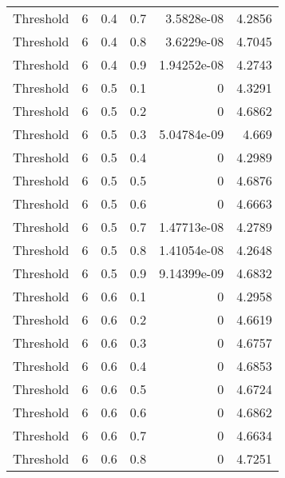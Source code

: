 \documentclass{article}
\begin{document}
\begin{longtable}[H]{lrrrrr}
 Threshold      &       6 &   0.4 &            0.7 &      3.5828e-08  &          4.2856 \\
 Threshold      &       6 &   0.4 &            0.8 &      3.6229e-08  &          4.7045 \\
 Threshold      &       6 &   0.4 &            0.9 &      1.94252e-08 &          4.2743 \\
 Threshold      &       6 &   0.5 &            0.1 &      0           &          4.3291 \\
 Threshold      &       6 &   0.5 &            0.2 &      0           &          4.6862 \\
 Threshold      &       6 &   0.5 &            0.3 &      5.04784e-09 &          4.669  \\
 Threshold      &       6 &   0.5 &            0.4 &      0           &          4.2989 \\
 Threshold      &       6 &   0.5 &            0.5 &      0           &          4.6876 \\
 Threshold      &       6 &   0.5 &            0.6 &      0           &          4.6663 \\
 Threshold      &       6 &   0.5 &            0.7 &      1.47713e-08 &          4.2789 \\
 Threshold      &       6 &   0.5 &            0.8 &      1.41054e-08 &          4.2648 \\
 Threshold      &       6 &   0.5 &            0.9 &      9.14399e-09 &          4.6832 \\
 Threshold      &       6 &   0.6 &            0.1 &      0           &          4.2958 \\
 Threshold      &       6 &   0.6 &            0.2 &      0           &          4.6619 \\
 Threshold      &       6 &   0.6 &            0.3 &      0           &          4.6757 \\
 Threshold      &       6 &   0.6 &            0.4 &      0           &          4.6853 \\
 Threshold      &       6 &   0.6 &            0.5 &      0           &          4.6724 \\
 Threshold      &       6 &   0.6 &            0.6 &      0           &          4.6862 \\
 Threshold      &       6 &   0.6 &            0.7 &      0           &          4.6634 \\
 Threshold      &       6 &   0.6 &            0.8 &      0           &          4.7251 \\

\end{longtable}
\end{document}
